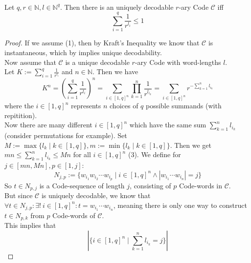 \documentclass[12pt]{article}
\newenvironment{statement3}[3]{\begin{trivlist}
\item[\hskip \labelsep {\bfseries #1}\hskip \labelsep {\bfseries #2} {#3}\textbf{.}]}{\end{trivlist}}
\begin{document}
\begin{statement3}{(1.7)}{Theorem}{(McMillan's Inequality)}\strut\\[2pt]
    Let $q,r \in \mathbb{N}, l \in \mathbb{N}^q$. Then there is an uniquely decodable
    $r$-ary Code $\mathcal{C}$ iff
    \begin{equation}
        \sum_{i=1}^{q} \frac{1}{r^{l_i}} \leq 1 \tag{1}
    \end{equation}

    \begin{proof}
        If we assume (1), then by Kraft's Inequality we know that $\mathcal{C}$
        is instantaneous, which by \cite{ICT} implies unique decodability.\\[10pt]
        Now assume that $\mathcal{C}$ is a unique decodable $r$-ary Code with word-lengths
        $l$.\\
        Let
        $
            K := \sum_{i=1}^{q} \frac{1}{r^{l_i}}
        $ and $n \in \mathbb{N}$.
        Then we have
        \begin{equation}
            K^n
            = \left(\sum_{i=1}^{q} \frac{1}{r^{l_i}}\right)^n
            = \sum_{i \in [1,q]^n}\prod_{k=1}^{n} \frac{1}{r^{l_{i_k}}}
            = \sum_{i \in [1,q]^n} r^{-\sum_{k=1}^{n} l_{i_k}} \tag{2}
        \end{equation}
        where the $i \in [1,q]^n$ represents $n$ choices of $q$ possible summands (with repitition).\\[10pt]
        Now there are many different $i \in [1,q]^n$ which have the same sum $\sum_{k=1}^{n} l_{i_k}$
        (consider permutations for example). Set $M := \max\{l_k\mid k \in [1,q]\}, m := \min\{l_k \mid k \in [1,q]\}$.
        Then we get $mn \leq \sum_{k=1}^{n} l_{i_k} \leq Mn$ for all $i \in [1,q]^n$ (3). We define for
        $j \in [mn,Mn], p \in [1,j]$:
        $$
            N_{j,p} := \{w_{i_1}w_{i_2}\cdots w_{i_p} \mid i \in [1,q]^n \land |w_{i_1}\cdots w_{i_n}| = j \}
        $$
        So $t \in N_{p,j}$ is a Code-sequence of length $j$, consisting of $p$ Code-words in $\mathcal{C}$.\\
        But since $\mathcal{C}$ is uniquely decodable, we know that
        $
            \forall t \in N_{j,p}: \exists!\ i \in [1,q]^n: t = w_{i_1}\cdots w_{i_n}
        $,
        meaning there is only one way to construct $t \in N_{p,k}$ from $p$ Code-words of $\mathcal{C}$.\\
        This implies that
        \begin{equation}
            |\{i \in [1,q]^n \mid \sum_{k=1}^{n} l_{i_k} = j\}|

\end{equation}
\end{proof}
\end{statement3}
\end{document}
